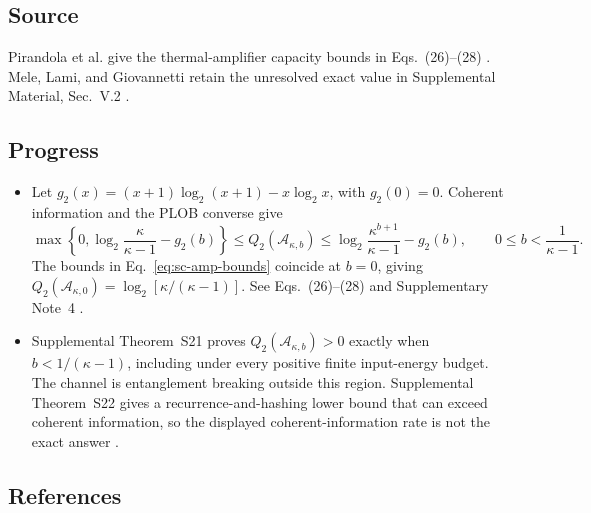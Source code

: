 \subsection*{Source}

Pirandola et al. give the thermal-amplifier capacity bounds in Eqs.~(26)--(28) . Mele, Lami, and Giovannetti retain the unresolved exact value in Supplemental Material, Sec.~V.2 .

\subsection*{Progress}

\begin{itemize}
  \item Let $g_2(x)=(x+1)\log_2(x+1)-x\log_2x$, with $g_2(0)=0$. Coherent information and the PLOB converse give
\begin{equation}
 \max\left\{0,\log_2\frac\kappa{\kappa-1}-g_2(b)\right\}
 \leq Q_2(\mathcal A_{\kappa,b})
 \leq\log_2\frac{\kappa^{b+1}}{\kappa-1}-g_2(b),\qquad 0\leq b<\frac1{\kappa-1}.
 \label{eq:sc-amp-bounds}
\end{equation}
The bounds in Eq.~\eqref{eq:sc-amp-bounds} coincide at $b=0$, giving $Q_2(\mathcal A_{\kappa,0})=\log_2[\kappa/(\kappa-1)]$. See Eqs.~(26)--(28) and Supplementary Note~4 .

  \item Supplemental Theorem~S21 proves $Q_2(\mathcal A_{\kappa,b})>0$ exactly when $b<1/(\kappa-1)$, including under every positive finite input-energy budget. The channel is entanglement breaking outside this region. Supplemental Theorem~S22 gives a recurrence-and-hashing lower bound that can exceed coherent information, so the displayed coherent-information rate is not the exact answer .
\end{itemize}

\subsection*{References}

